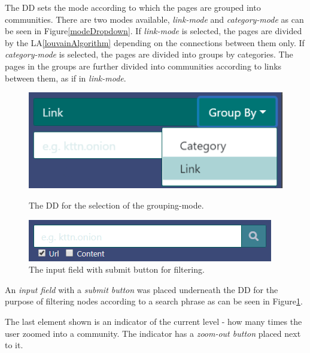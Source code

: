 The DD sets the mode according to which the pages are grouped into communities. There are two modes available, \textit{link-mode} and \textit{category-mode} as can be seen in Figure\ref{modeDropdown}. If \textit{link-mode} is selected, the pages are divided by the LA\ref{louvainAlgorithm} depending on the connections between them only. If \textit{category-mode} is selected, the pages are divided into groups by categories. The pages in the groups are further divided into communities according to links between them, as if in \textit{link-mode}. 
\begin{figure} 
  \begin{minipage}[t]{0.475\textwidth}
    \centering
    \includegraphics[width=\textwidth]{Images/mode_dropdown.png}
    \caption{The DD for the selection of the grouping-mode.}
    \label{modeDropdown}
  \end{minipage} \hfill
  \begin{minipage}[t]{0.475\textwidth}
    \centering
    \includegraphics[width=\textwidth]{Images/filter.png}
    \caption{The input field with submit button for filtering.}
    \label{filterNodesElement}
  \end{minipage}   
\end{figure}   

 An \textit{input field} with a \textit{submit button} was placed underneath the DD for the purpose of filtering nodes according to a search phrase as can be seen in Figure\ref{filterNodesElement}.

The last element shown is an indicator of the current level - how many times the user zoomed into a community. The indicator has a \textit{zoom-out button} placed next to it.

